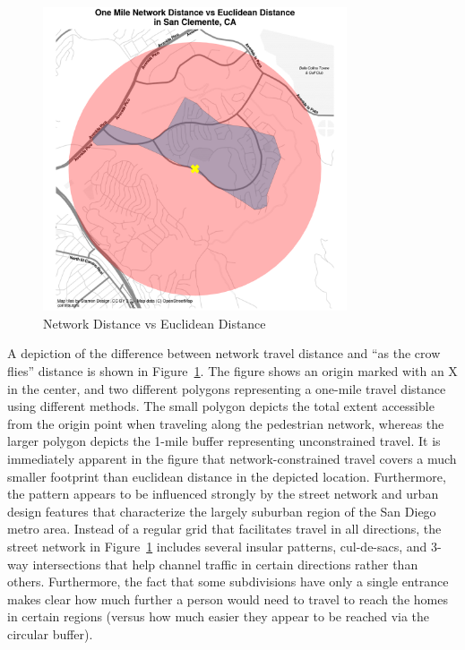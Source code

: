\documentclass[
  10pt,
]{article}
\begin{document}
\citet{grannis2005TCommunitiesPedestrian}
\citet{roberto2018SpatialProximity}

\begin{figure}
\hypertarget{fig:network_distance}{%
\centering
\includegraphics[width=0.8\textwidth,height=\textheight]{./figures/network_distance.png}
\caption{Network Distance vs Euclidean
Distance}\label{fig:network_distance}
}
\end{figure}

A depiction of the difference between network travel distance and ``as
the crow flies'' distance is shown in Figure~\ref{fig:network_distance}.
The figure shows an origin marked with an X in the center, and two
different polygons representing a one-mile travel distance using
different methods. The small polygon depicts the total extent accessible
from the origin point when traveling along the pedestrian network,
whereas the larger polygon depicts the 1-mile buffer representing
unconstrained travel. It is immediately apparent in the figure that
network-constrained travel covers a much smaller footprint than
euclidean distance in the depicted location. Furthermore, the pattern
appears to be influenced strongly by the street network and urban design
features that characterize the largely suburban region of the San Diego
metro area. Instead of a regular grid that facilitates travel in all
directions, the street network in Figure~\ref{fig:network_distance}
includes several insular patterns, cul-de-sacs, and 3-way intersections
that help channel traffic in certain directions rather than others.
Furthermore, the fact that some subdivisions have only a single entrance
makes clear how much further a person would need to travel to reach the
homes in certain regions (versus how much easier they appear to be
reached via the circular buffer).
\end{document}
